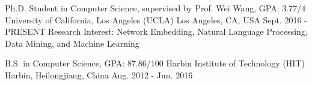 \begin{cventries}
  \cventry
    {Ph.D. Student in Computer Science, supervised by Prof. Wei Wang, GPA: 3.77/4}
    {University of California, Los Angeles (UCLA)}
    {Los Angeles, CA, USA}
    {Sept. 2016 - PRESENT}
    {Research Interest: Network Embedding, Natural Language Processing, Data Mining, and Machine Learning}
  
  \vspace{-0.5em}
  
  \cventry
    {B.S. in Computer Science, GPA: 87.86/100}
    {Harbin Institute of Technology (HIT)}
    {Harbin, Heilongjiang, China}
    {Aug. 2012 - Jun. 2016}{}
\end{cventries}
